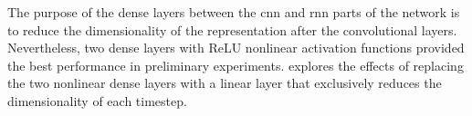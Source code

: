 
The purpose of the dense layers between the \gls{cnn} and
\gls{rnn} parts of the network is to reduce the
dimensionality of the representation after the convolutional
layers. Nevertheless, two dense layers with ReLU nonlinear
activation functions provided the best performance in
preliminary experiments. 
explores the effects of replacing the two nonlinear dense
layers with a linear layer that exclusively reduces the
dimensionality of each timestep.
